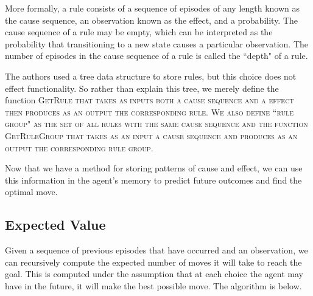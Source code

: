 \documentclass[letterpaper]{article} %
\begin{document}
More formally, a rule consists of a sequence of episodes of any length known as the cause sequence, an observation known as the effect, and a probability. The cause sequence of a rule may be empty, which can be interpreted as the probability  that transitioning to a new state causes a particular observation. The number of episodes in the cause sequence of a rule is called the ``depth" of a rule.

The authors used a tree data structure to store rules, but this choice does not effect functionality. So rather than explain this tree, we merely define the function \scshape GetRule \normalfont that takes as inputs both a cause sequence and a effect then produces as an output the corresponding rule. We also define ``rule group" as the set of all rules with the same cause sequence and the function \scshape GetRuleGroup \normalfont that takes as an input a cause sequence and produces as an output the corresponding rule group.



Now that we have a method for storing patterns of cause and effect, we can use this information in the agent's memory to predict future outcomes and find the optimal move.

\subsection{Expected Value}

Given a sequence of previous episodes that have occurred and an observation, we can recursively compute the expected number of moves it will take to reach the goal. This is computed under the assumption that at each choice the agent may have in the future, it will make the best possible move. The algorithm is below.
\end{document}
